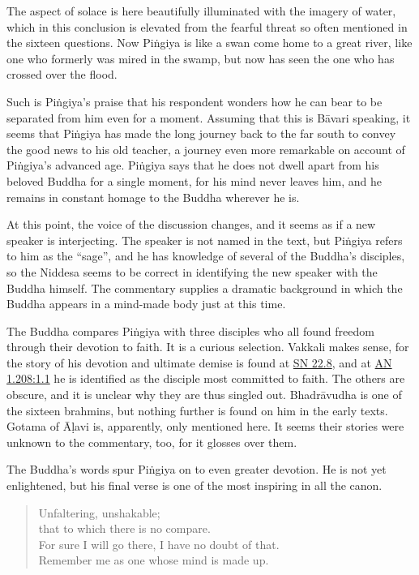 \documentclass[12pt,openany]{book}%
\begin{document}
The aspect of solace is here beautifully illuminated with the imagery of water, which in this conclusion is elevated from the fearful threat so often mentioned in the sixteen questions. Now \textsanskrit{Piṅgiya} is like a swan come home to a great river, like one who formerly was mired in the swamp, but now has seen the one who has crossed over the flood.

Such is \textsanskrit{Piṅgiya}’s praise that his respondent wonders how he can bear to be separated from him even for a moment. Assuming that this is \textsanskrit{Bāvari} speaking, it seems that \textsanskrit{Piṅgiya} has made the long journey back to the far south to convey the good news to his old teacher, a journey even more remarkable on account of \textsanskrit{Piṅgiya}’s advanced age. \textsanskrit{Piṅgiya} says that he does not dwell apart from his beloved Buddha for a single moment, for his mind never leaves him, and he remains in constant homage to the Buddha wherever he is.

At this point, the voice of the discussion changes, and it seems as if a new speaker is interjecting. The speaker is not named in the text, but \textsanskrit{Piṅgiya} refers to him as the “sage”, and he has knowledge of several of the Buddha’s disciples, so the Niddesa seems to be correct in identifying the new speaker with the Buddha himself. The commentary supplies a dramatic background in which the Buddha appears in a mind-made body just at this time.

The Buddha compares \textsanskrit{Piṅgiya} with three disciples who all found freedom through their devotion to faith. It is a curious selection. Vakkali makes sense, for the story of his devotion and ultimate demise is found at \href{https://suttacentral.net/sn22.8/en/sujato}{SN 22.8}, and at \href{https://suttacentral.net/an1.208/en/sujato\#1.1}{AN 1.208:1.1} he is identified as the disciple most committed to faith. The others are obscure, and it is unclear why they are thus singled out. \textsanskrit{Bhadrāvudha} is one of the sixteen brahmins, but nothing further is found on him in the early texts. Gotama of \textsanskrit{Āḷavi} is, apparently, only mentioned here. It seems their stories were unknown to the commentary, too, for it glosses over them.

The Buddha’s words spur \textsanskrit{Piṅgiya} on to even greater devotion. He is not yet enlightened, but his final verse is one of the most inspiring in all the canon.

\begin{verse}%
Unfaltering, unshakable; \\
that to which there is no compare. \\
For sure I will go there, I have no doubt of that. \\
Remember me as one whose mind is made up.

%
\end{verse}
\end{document}
